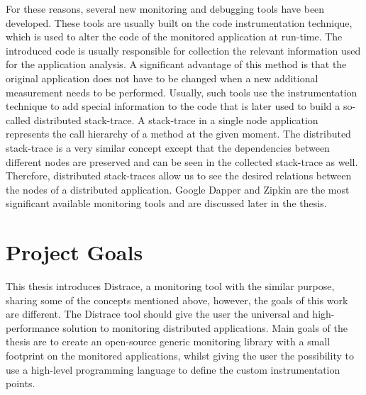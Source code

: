 For these reasons, several new monitoring and debugging tools have been developed. These tools are usually built on the code instrumentation technique, which is used to alter the code of the monitored application at run-time. The introduced code is usually responsible for collection the relevant information used for the application analysis. A significant advantage of this method is that the original application does not have to be changed when a new additional measurement needs to be performed. Usually, such tools use the instrumentation technique to add special information to the code that is later used to build a so-called distributed stack-trace. A stack-trace in a single node application represents the call hierarchy of a method at the given moment. The distributed stack-trace is a very similar concept except that the dependencies between different nodes are preserved and can be seen in the collected stack-trace as well. Therefore, distributed stack-traces allow us to see the desired relations between the nodes of a distributed application. Google Dapper and Zipkin are the most significant available monitoring tools and are discussed later in the thesis. 


\section{Project Goals}
This thesis introduces Distrace, a monitoring tool with the similar purpose, sharing some of the concepts mentioned above, however, the goals of this work are different. The Distrace tool should give the user the universal and high-performance solution to monitoring distributed applications. Main goals of the thesis are to create an open-source generic monitoring library with a small footprint on the monitored applications, whilst giving the user the possibility to use a high-level programming language to define the custom instrumentation points.

